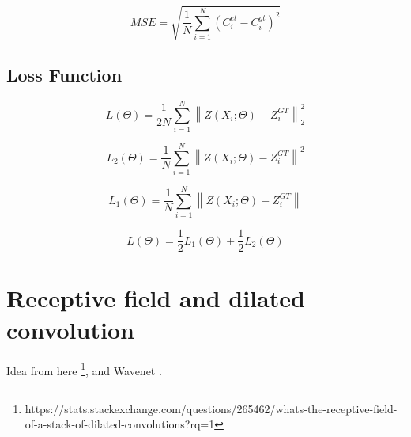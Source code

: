 \documentclass[a4paper]{article}
\theoremstyle{definition}
\theoremstyle{plain}
\begin{document}
\begin{equation}M S E=\sqrt{\frac{1}{N} \sum_{i=1}^{N}\left(C_{i}^{e t}-C_{i}^{g t}\right)^{2}}\end{equation}

\subsection{Loss Function}

\begin{equation}L(\Theta)=\frac{1}{2 N} \sum_{i=1}^{N}\left\|Z\left(X_{i} ; \Theta\right)-Z_{i}^{G T}\right\|_{2}^{2}\end{equation}

\begin{equation}L_2(\Theta)=\frac{1}{N} \sum_{i=1}^{N}\left\|Z\left(X_{i} ; \Theta\right)-Z_{i}^{G T}\right\|^{2}\end{equation}

\begin{equation}L_1(\Theta)=\frac{1}{N} \sum_{i=1}^{N}\left\|Z\left(X_{i} ; \Theta\right)-Z_{i}^{G T}\right\|\end{equation}

\begin{equation}
    L(\Theta) = \frac{1}{2}L_1(\Theta) + \frac{1}{2}L_2(\Theta)
\end{equation}

\section{Receptive field and dilated convolution}

Idea from here \footnote{https://stats.stackexchange.com/questions/265462/whats-the-receptive-field-of-a-stack-of-dilated-convolutions?rq=1}, and Wavenet \cite{45774}.



\end{document}
